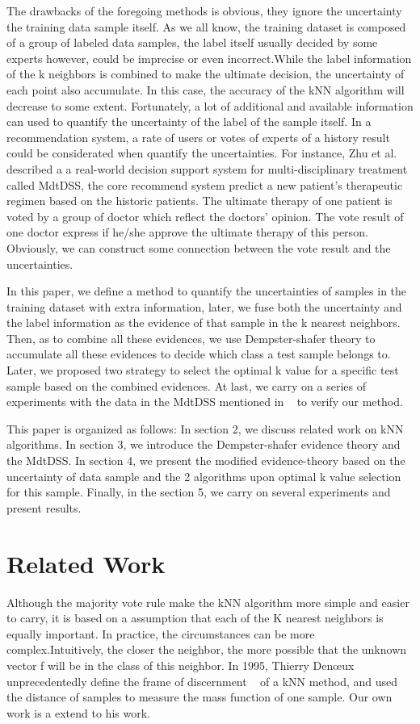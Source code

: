 \documentclass[runningheads]{llncs}
\begin{document}
The drawbacks of the foregoing methods is obvious, they ignore the uncertainty the training data sample itself. As we all know, the training dataset is composed of a group of labeled data samples, the label itself usually decided by some experts however, could be imprecise or even incorrect.While the label information of the k neighbors is combined to make the ultimate decision, the uncertainty of each point also accumulate. In this case, the accuracy of the kNN algorithm will decrease to some extent. Fortunately, a lot of additional and available information can used to quantify the uncertainty of the label of the sample itself. In a recommendation system, a rate of users or votes of experts of a history result could be considerated when quantify the uncertainties. For instance, Zhu et al.~\cite{ref_article9} described a a real-world decision support system for multi-disciplinary treatment called MdtDSS, the core recommend system predict a new patient's therapeutic regimen based on the historic patients. The ultimate therapy of one patient is voted by a group of doctor which reflect the doctors' opinion. The vote result of one doctor express if he/she approve the ultimate therapy of this person. Obviously, we can construct some connection between the vote result and the uncertainties.

In this paper, we define a method to quantify the uncertainties of samples in the training dataset with extra information, later, we fuse both the uncertainty and the label information as the evidence of that sample in the k nearest neighbors. Then, as to combine all these evidences, we use Dempster-shafer theory to accumulate  all these evidences to decide which class a test sample belongs to. Later, we proposed two strategy to select the optimal k value for a specific test sample based on the combined evidences. At last, we carry on a series of experiments with the data in the MdtDSS mentioned in ~\cite{ref_article9} to verify our method.

This paper is organized as follows: In section 2, we discuss related work on kNN algorithms. In section 3, we introduce the Dempster-shafer evidence theory and the MdtDSS. In section 4, we present the modified evidence-theory based on the uncertainty of data sample and the 2 algorithms upon optimal k value selection for this sample. Finally, in the section 5, we carry on several experiments and present results.


\section{Related Work}
Although the majority vote rule make the kNN algorithm more simple and easier to carry, it is based on a assumption that each of the K nearest neighbors is equally important. In practice, the circumstances can be more complex.Intuitively, the closer the neighbor, the more possible that the unknown vector f will be in the class of this neighbor. In 1995, Thierry Denœux~\cite{ref_article3} unprecedentedly define the frame of discernment ~\cite{ref_article10} of a kNN method, and used  the distance of samples to measure the mass function of one sample. Our own work is a extend to his work.
\end{document}
